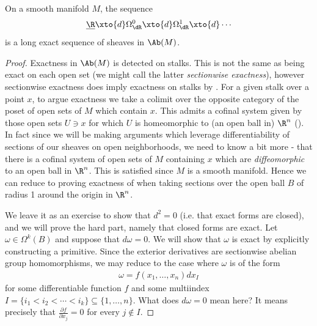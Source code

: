 \documentclass[11pt]{book}
\begin{document}
\begin{lemma} 
\label{lem:Poincare-lemma}
On a smooth manifold $M$, the sequence
\begin{equation}\label{eqn:de-Rham-sequence}
\begin{aligned}
    \underline{\R} \xto{d} \Omega^0_\dR \xto{d} \Omega^1_\dR \xto{d} \cdots
\end{aligned}
\end{equation}
is a long exact sequence of sheaves in $\Ab(M)$.
\end{lemma}
\begin{proof} Exactness in $\Ab(M)$ is detected on stalks. This is not the same as being exact on each open set (we might call the latter \emph{sectionwise exactness}), however sectionwise exactness does imply exactness on stalks by . For a given stalk over a point $x$, to argue exactness we take a colimit over the opposite category of the poset of open sets of $M$ which contain $x$. This admits a cofinal system given by those open sets $U\ni x$ for which $U$ is homeomorphic to (an open ball in) $\R^n$ (). In fact since we will be making arguments which leverage differentiability of sections of our sheaves on open neighborhoods, we need to know a bit more - that there is a cofinal system of open sets of $M$ containing $x$ which are \emph{diffeomorphic} to an open ball in $\R^n$. This is satisfied since $M$ is a smooth manifold. Hence we can reduce to proving exactness of  when taking sections over the open ball $B$ of radius 1 around the origin in $\R^n$.


We leave it as an exercise to show that $d^2 = 0$ (i.e. that exact forms are closed), and we will prove the hard part, namely that closed forms are exact. Let $\omega \in \Omega^k(B)$ and suppose that $d\omega = 0$. We will show that $\omega$ is exact by explicitly constructing a primitive. Since the exterior derivatives are sectionwise abelian group homomorphisms, we may reduce to the case where $\omega$ is of the form
\begin{align*}
    \omega = f(x_1, \ldots, x_n) dx_I
\end{align*}
for some differentiable function $f$ and some multiindex $I = \{i_1 < i_2 < \cdots < i_k\} \subseteq \{1, \ldots, n\}$. What does $d\omega = 0$ mean here? It means precisely that $\frac{\partial f}{\partial x_j} = 0$ for every $j\notin I$.


\end{proof}
\end{document}
